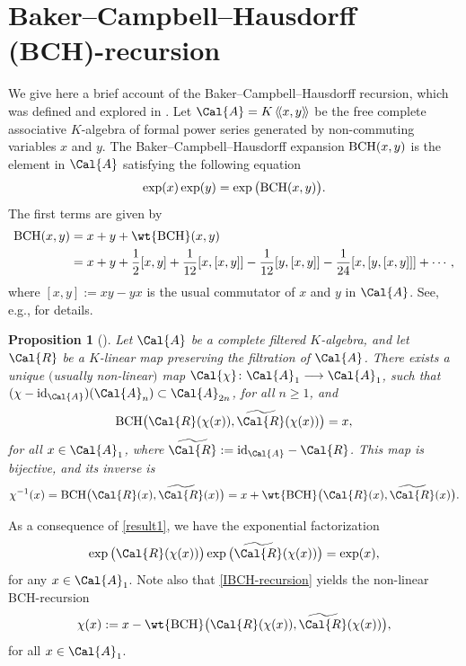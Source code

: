 \documentclass[10pt,a4paper]{amsart}
\numberwithin{equation}{section}
\newtheorem{Proposition}[Theorem]{Proposition}
 { \theoremstyle{definition}
\newtheorem{Definition}[Theorem]{Definition}
\newtheorem{Note}[Theorem]{Note}
\newtheorem{Example}[Theorem]{Example}
\newtheorem{Remark}[Theorem]{Remark} }
\begin{document}
\section{Baker--Campbell--Hausdorff (BCH)-recursion}\label{s2}

We give here a brief account of the Baker--Campbell--Hausdorff recursion, which was defined and explored in \cite{KLK04, KLK05, KLM06}. Let $\Cal{A} = K\left\langle\!\left\langle x, y \right\rangle\!\right\rangle$ be the free complete associative $K$-algebra of formal power series generated by non-commuting variables $x$ and $y$. The Baker--Campbell--Hausdorff expansion ${\rm BCH}(x, y)$ is the element in $\Cal{A}$ satisfying the following equation
\begin{displaymath}
\exp(x)\exp(y) = \exp\big({\rm BCH}(x, y)\big).
\end{displaymath}
The first terms are given by
\begin{align*}
{\rm BCH}(x, y)
&= x+y+\wt{{\rm BCH}}(x,y)\\
&=x+y+\frac{1}{2} [x, y] + \frac{1}{12}[x, [x, y]] - \frac{1}{12}[y, [x, y]]
-\frac{1}{24} [x, [y, [x, y]]] + \cdots,
\end{align*}
where $[x, y] := xy-yx$ is the usual commutator of $x$ and $y$ in $\Cal{A}$. See, e.g., \cite{BF12} for details.

\begin{Proposition}[{\cite[Proposition $1$]{KLM06}}]
Let $\Cal{A}$ be a complete filtered $K$-algebra, and let $\Cal{R}$ be a $K$-linear map preserving the filtration of $\Cal{A}$. There exists a unique $($usually non-linear$)$ map $\Cal{\chi}\colon \Cal{A}_1 \longrightarrow \Cal{A}_1$, such that $(\chi - {\rm id}_{\Cal{A}})(\Cal{A}_n) \subset \Cal{A}_{2n}$, for all $n \geq 1$, and
\begin{equation}
\label{result1}
{\rm BCH}\big(\Cal{R}(\chi(x)), \widetilde{\Cal{R}}(\chi(x))\big) = x,
\end{equation}
for all $x \in \Cal{A}_1$, where $\widetilde{\Cal{R}} := {\rm id}_{\Cal{A}} - \Cal{R}$. This map is bijective, and its inverse is
\begin{equation}
\label{IBCH-recursion}
\chi^{-1}(x)
= {\rm BCH}\big(\Cal{R}(x), \widetilde{\Cal{R}}(x)\big)
= x + \wt{{\rm BCH}}\big(\Cal{R}(x), \widetilde{\Cal{R}}(x)\big).
\end{equation}
\end{Proposition}

As a consequence of \eqref{result1}, we have the exponential factorization
\begin{equation}\label{exp-fact}
\exp\big(\Cal{R}(\chi(x))\big)\exp\big(\widetilde{\Cal{R}}(\chi(x))\big) = \exp(x),
\end{equation}
for any $x \in \Cal{A}_1$. Note also that \eqref{IBCH-recursion} yields the non-linear BCH-recursion
\begin{equation}
\label{BCH-recursion}
\chi(x) := x - \wt{{\rm BCH}}\big(\Cal{R}(\chi(x)), \widetilde{\Cal{R}}(\chi(x))\big),
\end{equation}
for all $x \in \Cal{A}_1$.
\end{document}
